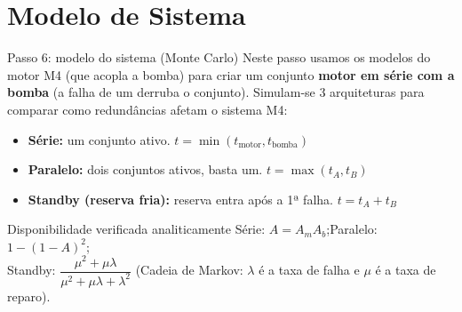 \documentclass{beamer}
\begin{document}
\section{Modelo de Sistema}



\begin{frame}{Passo 6: modelo do sistema (Monte Carlo)}
    \small
    Neste passo usamos os modelos do motor M4 (que acopla a bomba) para criar um conjunto \textbf{motor em série com a bomba} (a falha de um derruba o conjunto). Simulam-se 3 arquiteturas para comparar como redundâncias afetam o sistema M4:
    \vspace{0.15cm}
    \begin{itemize}
        \item \textbf{Série:} um conjunto ativo. \hfill $t = \min(t_{\text{motor}}, t_{\text{bomba}})$
        \item \textbf{Paralelo:} dois conjuntos ativos, basta um. \hfill $t = \max(t_A, t_B)$
        \item \textbf{Standby (reserva fria):} reserva entra após a 1ª falha. \hfill $t = t_A + t_B$
    \end{itemize}
    \vspace{0.15cm}
    \begin{block}{Disponibilidade verificada analiticamente}
        Série: $A=A_m A_b$;\quad Paralelo: $1-(1-A)^2$;\\
        Standby: $\dfrac{\mu^2+\mu\lambda}{\mu^2+\mu\lambda+\lambda^2}$ (Cadeia de Markov: $\lambda$ é a taxa de falha e $\mu$ é a taxa de reparo).
    \end{block}
\end{frame}
\end{document}
